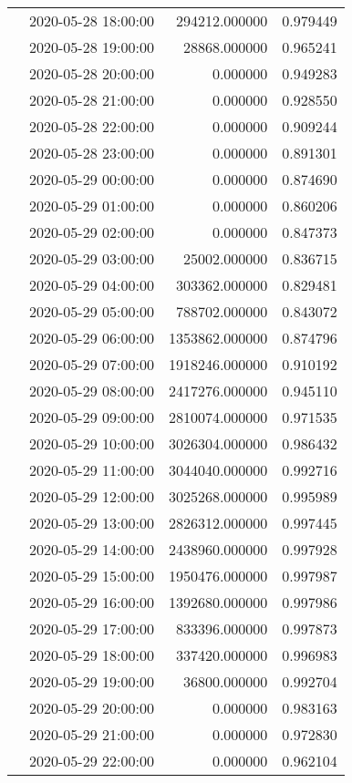 \begin{tabular}{llrr}
 & 2020-05-28 18:00:00 & 294212.000000 & 0.979449 \\
 & 2020-05-28 19:00:00 & 28868.000000 & 0.965241 \\
 & 2020-05-28 20:00:00 & 0.000000 & 0.949283 \\
 & 2020-05-28 21:00:00 & 0.000000 & 0.928550 \\
 & 2020-05-28 22:00:00 & 0.000000 & 0.909244 \\
 & 2020-05-28 23:00:00 & 0.000000 & 0.891301 \\
 & 2020-05-29 00:00:00 & 0.000000 & 0.874690 \\
 & 2020-05-29 01:00:00 & 0.000000 & 0.860206 \\
 & 2020-05-29 02:00:00 & 0.000000 & 0.847373 \\
 & 2020-05-29 03:00:00 & 25002.000000 & 0.836715 \\
 & 2020-05-29 04:00:00 & 303362.000000 & 0.829481 \\
 & 2020-05-29 05:00:00 & 788702.000000 & 0.843072 \\
 & 2020-05-29 06:00:00 & 1353862.000000 & 0.874796 \\
 & 2020-05-29 07:00:00 & 1918246.000000 & 0.910192 \\
 & 2020-05-29 08:00:00 & 2417276.000000 & 0.945110 \\
 & 2020-05-29 09:00:00 & 2810074.000000 & 0.971535 \\
 & 2020-05-29 10:00:00 & 3026304.000000 & 0.986432 \\
 & 2020-05-29 11:00:00 & 3044040.000000 & 0.992716 \\
 & 2020-05-29 12:00:00 & 3025268.000000 & 0.995989 \\
 & 2020-05-29 13:00:00 & 2826312.000000 & 0.997445 \\
 & 2020-05-29 14:00:00 & 2438960.000000 & 0.997928 \\
 & 2020-05-29 15:00:00 & 1950476.000000 & 0.997987 \\
 & 2020-05-29 16:00:00 & 1392680.000000 & 0.997986 \\
 & 2020-05-29 17:00:00 & 833396.000000 & 0.997873 \\
 & 2020-05-29 18:00:00 & 337420.000000 & 0.996983 \\
 & 2020-05-29 19:00:00 & 36800.000000 & 0.992704 \\
 & 2020-05-29 20:00:00 & 0.000000 & 0.983163 \\
 & 2020-05-29 21:00:00 & 0.000000 & 0.972830 \\
 & 2020-05-29 22:00:00 & 0.000000 & 0.962104 \\

\end{tabular}
